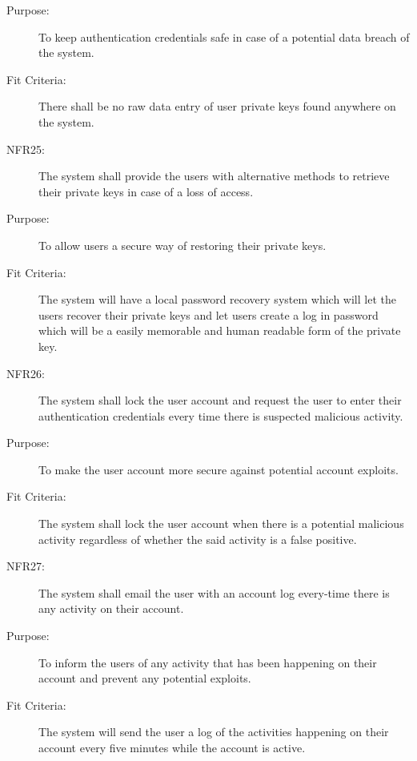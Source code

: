 \documentclass[a4paper,twoside,phd]{BYUPhys}
\begin{document}
\begin{description}
\item[Purpose:] To keep authentication credentials safe in case of a potential data breach of the system.
\item[Fit Criteria:] There shall be no raw data entry of user private keys found anywhere on the system.
\item[NFR25:] The system shall provide the users with alternative methods to retrieve their private keys in case of a loss of access.
\item[Purpose:] To allow users a secure way of restoring their private keys.
\item[Fit Criteria:] The system will have a local password recovery system which will let the users recover their private keys and let users create a log in password which will be a easily memorable and human readable form of the private key.
\item[NFR26:] The system shall lock the user account and request the user to  enter their authentication credentials every time there is suspected malicious activity.
\item[Purpose:] To make the user account more secure against potential account exploits.
\item[Fit Criteria:] The system shall lock the user account when there is a potential malicious activity regardless of whether the said activity is a false positive.
\item[NFR27:] The system shall email the user with an account log every-time there is any activity on their account.
\item[Purpose:] To inform the users of any activity that has been happening on their account and prevent any potential exploits.
\item[Fit Criteria:] The system will send the user a log of the activities happening on their account every five minutes while the account is active.
\end{description}
\end{document}
